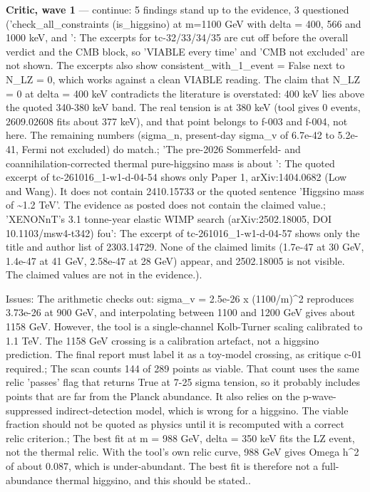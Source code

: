 \documentclass[11pt,a4paper]{article}
\begin{document}
\textbf{Critic, wave 1} --- continue: 5 findings stand up to the evidence, 3 questioned ('check\_all\_constraints (is\_higgsino) at m=1100 GeV with delta = 400, 566 and 1000 keV, and ': The excerpts for tc-32/33/34/35 are cut off before the overall verdict and the CMB block, so 'VIABLE every time' and 'CMB not excluded' are not shown. The excerpts also show consistent\_with\_1\_event = False next to N\_LZ = 0, which works against a clean VIABLE reading. The claim that N\_LZ = 0 at delta = 400 keV contradicts the literature is overstated: 400 keV lies above the quoted 340-380 keV band. The real tension is at 380 keV (tool gives 0 events, 2609.02608 fits about 377 keV), and that point belongs to f-003 and f-004, not here. The remaining numbers (sigma\_n, present-day sigma\_v of 6.7e-42 to 5.2e-41, Fermi not excluded) do match.; 'The pre-2026 Sommerfeld- and coannihilation-corrected thermal pure-higgsino mass is about ': The quoted excerpt of tc-261016\_1-w1-d-04-54 shows only Paper 1, arXiv:1404.0682 (Low and Wang). It does not contain 2410.15733 or the quoted sentence 'Higgsino mass of \textasciitilde{}1.2 TeV'. The evidence as posted does not contain the claimed value.; 'XENONnT's 3.1 tonne-year elastic WIMP search (arXiv:2502.18005, DOI 10.1103/msw4-t342) fou': The excerpt of tc-261016\_1-w1-d-04-57 shows only the title and author list of 2303.14729. None of the claimed limits (1.7e-47 at 30 GeV, 1.4e-47 at 41 GeV, 2.58e-47 at 28 GeV) appear, and 2502.18005 is not visible. The claimed values are not in the evidence.).

Issues: The arithmetic checks out: sigma\_v = 2.5e-26 x (1100/m)\textasciicircum{}2 reproduces 3.73e-26 at 900 GeV, and interpolating between 1100 and 1200 GeV gives about 1158 GeV. However, the tool is a single-channel Kolb-Turner scaling calibrated to 1.1 TeV. The 1158 GeV crossing is a calibration artefact, not a higgsino prediction. The final report must label it as a toy-model crossing, as critique c-01 required.; The scan counts 144 of 289 points as viable. That count uses the same relic 'passes' flag that returns True at 7-25 sigma tension, so it probably includes points that are far from the Planck abundance. It also relies on the p-wave-suppressed indirect-detection model, which is wrong for a higgsino. The viable fraction should not be quoted as physics until it is recomputed with a correct relic criterion.; The best fit at m = 988 GeV, delta = 350 keV fits the LZ event, not the thermal relic. With the tool's own relic curve, 988 GeV gives Omega h\textasciicircum{}2 of about 0.087, which is under-abundant. The best fit is therefore not a full-abundance thermal higgsino, and this should be stated..
\end{document}
